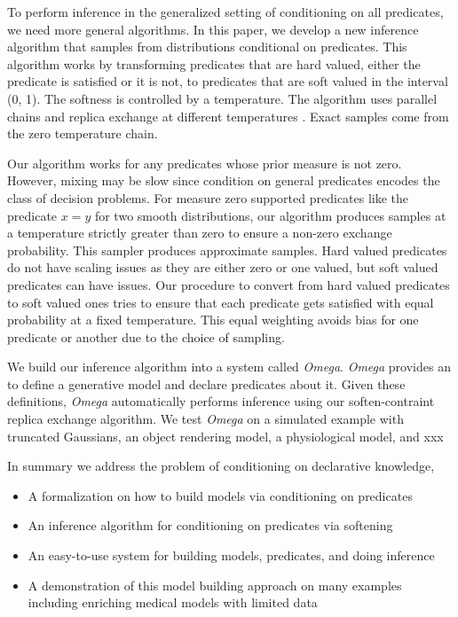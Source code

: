 

To perform inference in the generalized setting of conditioning on 
all predicates, we need more general algorithms. In this paper,
we develop a new inference algorithm that samples from distributions
conditional on predicates. This algorithm works by transforming predicates
that are hard valued, either the predicate is satisfied
or it is not, to predicates that are soft valued in the interval
(0, 1). The softness is controlled by a temperature. 
The algorithm uses parallel chains and 
replica exchange at different temperatures \citep{}. Exact samples come
from the zero temperature chain. 


Our algorithm works for any predicates whose prior measure is not
zero. However, mixing may be slow since condition on general predicates
encodes the class of decision problems.
For measure zero supported predicates like the
predicate $x=y$ for two smooth distributions, our algorithm
produces samples at a temperature strictly greater than
zero to ensure a non-zero exchange probability. This sampler
produces approximate samples. Hard valued predicates do not
have scaling issues as they are either zero or one valued,
but soft valued predicates can have issues. Our procedure
to convert from hard valued predicates to soft valued ones
tries to ensure that each predicate gets satisfied with equal
probability at a fixed temperature. This equal weighting 
avoids bias for one predicate or another due to the choice of sampling.


We build our inference algorithm into a system called \emph{Omega}.
\emph{Omega} provides an to define a generative model and declare
predicates about it. Given these definitions, \emph{Omega} automatically
performs inference using our soften-contraint replica exchange algorithm.
We test \emph{Omega} on a simulated example with truncated Gaussians,
an object rendering model, a physiological model, and xxx 

In summary we address the problem of conditioning on declarative knowledge,
\begin{itemize}
	\item A formalization on how to build models via conditioning on predicates
	\item An inference algorithm for conditioning on predicates via softening
	\item An easy-to-use system for building models, predicates, and doing inference
	\item A demonstration of this model building approach on many examples including enriching medical models with limited data
\end{itemize}


